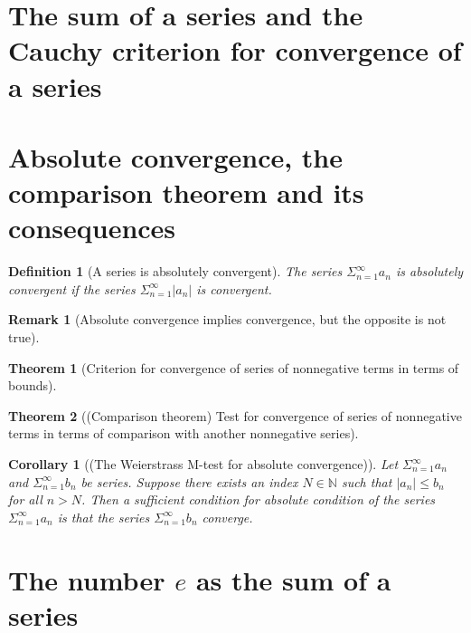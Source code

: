 \documentclass[onecolumn]{ctexart}
\newtheorem{definition}{Definition}
\newtheorem{theorem}{Theorem}
\newtheorem{corollary}{Corollary}
\newtheorem{remark}{Remark}
\begin{document}
\section{The sum of a series and the Cauchy criterion for convergence of a series}

\section{Absolute convergence, the comparison theorem and its consequences}

\begin{definition}[A series is absolutely convergent]
  The series $\Sigma_{n=1}^{\infty} a_n$ is absolutely convergent if the series $\Sigma_{n=1}^{\infty} \vert a_n \vert$ is convergent.
\end{definition}

\begin{remark}[Absolute convergence implies convergence, but the opposite is not true]
  
\end{remark}

\begin{theorem}[Criterion for convergence of series of nonnegative terms in terms of bounds]
  
\end{theorem}

\begin{theorem}[(Comparison theorem) Test for convergence of series of nonnegative terms in terms of comparison with another nonnegative series]
  
\end{theorem}

\begin{corollary}[(The Weierstrass M-test for absolute convergence)]
  Let $\Sigma_{n=1}^{\infty} a_n$ and $\Sigma_{n=1}^{\infty} b_n$ be series. Suppose there exists an index $N \in \mathbb{N}$ such that $\vert a_n \vert \leq b_n$ for all $n > N$. Then a sufficient condition for absolute condition of the series $\Sigma_{n=1}^{\infty} a_n$ is that the series $\Sigma_{n=1}^{\infty} b_n$ converge.
\end{corollary}

\section{The number $e$ as the sum of a series}
\end{document}
